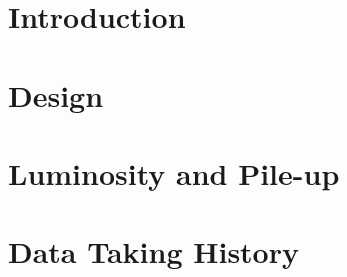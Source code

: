 \section{Introduction}

\section{Design}

\section{Luminosity and Pile-up}
\label{sec:LHC:luminosity}

\section{Data Taking History}
